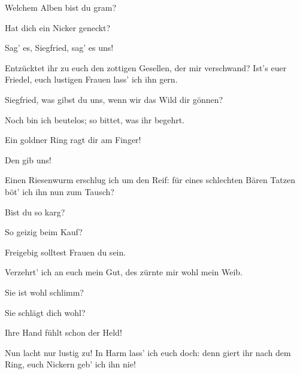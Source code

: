 \begin{drama}
\Wellgundespeaks

Welchem Alben bist du gram?
 

\Woglindespeaks

Hat dich ein Nicker geneckt?
 

Sag' es, Siegfried, sag' es uns!
 

\Siegfriedspeaks



Entzücktet ihr zu euch den zottigen Gesellen,
der mir verschwand?
Ist's euer Friedel,
euch lustigen Frauen lass' ich ihn gern.



\Woglindespeaks

Siegfried, was gibst du uns,
wenn wir das Wild dir gönnen?
 

\Siegfriedspeaks

Noch bin ich beutelos;
so bittet, was ihr begehrt.
 

\Wellgundespeaks

Ein goldner Ring ragt dir am Finger!
 

Den gib uns!
 

\Siegfriedspeaks

Einen Riesenwurm erschlug ich um den Reif:
für eines schlechten Bären Tatzen
böt' ich ihn nun zum Tausch?
 

\Woglindespeaks

Bist du so karg?
 

\Wellgundespeaks

So geizig beim Kauf?
 

\Flosshildespeaks

Freigebig solltest Frauen du sein.
 

\Siegfriedspeaks

Verzehrt' ich an euch mein Gut,
des zürnte mir wohl mein Weib.
 

\Flosshildespeaks

Sie ist wohl schlimm?
 

\Wellgundespeaks

Sie schlägt dich wohl?
 

\Woglindespeaks

Ihre Hand fühlt schon der Held!
 




\Siegfriedspeaks

Nun lacht nur lustig zu!
In Harm lass' ich euch doch:
denn giert ihr nach dem Ring,
euch Nickern geb' ich ihn nie!
 



\end{drama}
